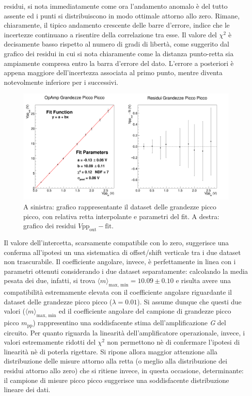 \documentclass[a4paper,11pt]{article} %
\begin{document}
residui, si nota immediatamente come ora l'andamento anomalo è del tutto assente ed i punti si distribuiscono in modo
ottimale attorno allo zero. Rimane, chiaramente, il tipico andamento crescente delle barre d'errore, indice che le
incertezze continuano a risentire della correlazione tra esse. Il valore del $\chi^2$ è decisamente basso rispetto al
numero di gradi di libertà, come suggerito dal grafico dei residui in cui si nota chiaramente come la distanza
punto-retta sia ampiamente compresa entro la barra d'errore del dato. L'errore a posteriori è appena maggiore
dell'incertezza associata al primo punto, mentre diventa notevolmente inferiore per i successivi.
\begin{figure}[H]
	\centering
	\includegraphics[width=\linewidth]{../Plots/Report_Plots/opamp_plot_pp_projected.png}
	\caption{\small A sinistra: grafico rappresentante il dataset delle grandezze picco picco, 
	con relativa retta interpolante e parametri del fit. A destra: grafico dei residui $V\text{pp}_{\text{out}}-\text{fit}$.}
	\label{i:opamp_pp}
\end{figure}

\noindent  Il valore dell'intercetta, scarsamente compatibile con lo zero, suggerisce una conferma all'ipotesi un una
sistematica di offset/shift verticale tra i due dataset non trascurabile. Il coefficiente angolare, invece, è
perfettamente in linea con i parametri ottenuti considerando i due dataset separatamente: calcolando la media pesata dei
due, infatti, si trova $\langle m\rangle_{\text{max, min}}=10.09 \pm 0.10$ e risulta avere una compatibilità
estremamente elevata con il coefficiente angolare riguardante il dataset delle grandezze picco picco ($\lambda = 0.01$).
Si assume dunque che questi due valori ($\langle m\rangle_{\text{max, min}}$ ed il coefficiente angolare del campione di
grandezze picco picco $m_{\text{pp}}$) rappresentino una soddisfacente stima dell'amplificazione \textit{G} del
circuito. Per quanto riguarda la linearità dell'amplificatore operazionale, invece, i valori estremamente ridotti del
$\chi^2$ non permettono nè di confermare l'ipotesi di linearità nè di poterla rigettare. Si ripone allora maggior
attenzione alla distribuzione delle misure attorno alla retta (o meglio alla distribuzione dei residui attorno allo
zero) che si ritiene invece, in questa occasione, determinante: il campione di misure picco picco suggerisce una
soddisfacente distribuzione lineare dei dati. 
\end{document}
